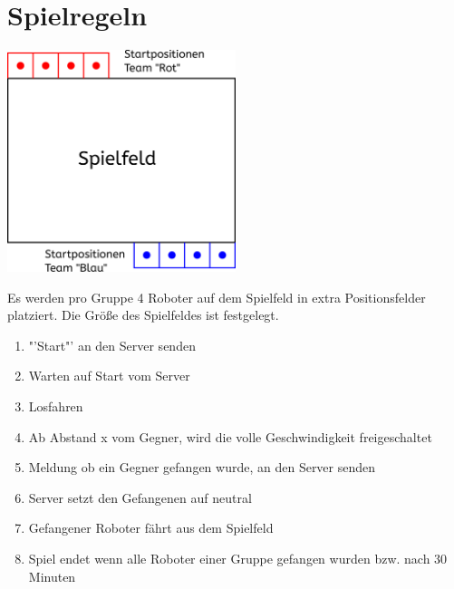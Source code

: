 \section{Spielregeln}
\begin{center}
	\includegraphics[width=0.5\textwidth]{Bilder/Spielfeld.pdf}
\end{center}
Es werden pro Gruppe 4 Roboter auf dem Spielfeld in extra Positionsfelder platziert.
Die Größe des Spielfeldes ist festgelegt.

\begin{enumerate}
	\item "'Start"' an den Server senden
	\item Warten auf Start vom Server
	\item Losfahren
	\item Ab Abstand x vom Gegner, wird die volle Geschwindigkeit freigeschaltet
	\item Meldung ob ein Gegner gefangen wurde, an den Server senden
	\item Server setzt den Gefangenen auf neutral
	\item Gefangener Roboter fährt aus dem Spielfeld
	\item Spiel endet wenn alle Roboter einer Gruppe gefangen wurden bzw. nach 30 Minuten
\end{enumerate}